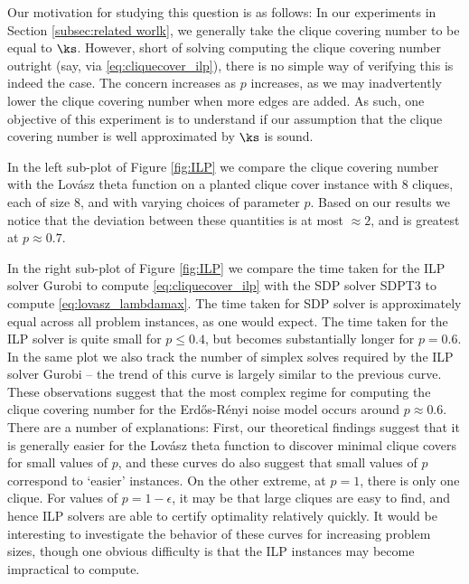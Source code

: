 Our motivation for studying this question is as follows:  In our experiments in Section \ref{subsec:related worlk}, we generally take the clique covering number to be equal to $\ks$.  However, short of solving computing the clique covering number outright (say, via \eqref{eq:cliquecover_ilp}), there is no simple way of verifying this is indeed the case.  The concern increases as $p$ increases, as we may inadvertently lower the clique covering number when more edges are added.  As such, one objective of this experiment is to understand if our assumption that the clique covering number is well approximated by $\ks$ is sound.  


In the left sub-plot of Figure \ref{fig:ILP} we compare the clique covering number with the Lov\'asz theta function on a planted clique cover instance with $8$ cliques, each of size $8$, and with varying choices of parameter $p$.  Based on our results we notice that the deviation between these quantities is at most $\approx 2$, and is greatest at $p \approx 0.7$.  

In the right sub-plot of Figure \ref{fig:ILP} we compare the time taken for the ILP solver Gurobi \cite{gurobi} to compute \eqref{eq:cliquecover_ilp} with the SDP solver SDPT3 \cite{sdpt3:1,sdpt3:2} to compute \eqref{eq:lovasz_lambdamax}.  The time taken for SDP solver is approximately equal across all problem instances, as one would expect.  The time taken for the ILP solver is quite small for $p \leq 0.4$, but becomes substantially longer for $p=0.6$.  In the same plot we also track the number of simplex solves required by the ILP solver Gurobi -- the trend of this curve is largely similar to the previous curve.  These observations suggest that the most complex regime for computing the clique covering number for the Erd\H{o}s-R\'enyi noise model occurs around $p \approx 0.6$.  There are a number of explanations: First, our theoretical findings suggest that it is generally easier for the Lov\'asz theta function to discover minimal clique covers for small values of $p$, and these curves do also suggest that small values of $p$ correspond to `easier' instances.  On the other extreme, at $p = 1$, there is only one clique.  For values of $p = 1-\epsilon$, it may be that large cliques are easy to find, and hence ILP solvers are able to certify optimality relatively quickly.  It would be interesting to investigate the behavior of these curves for increasing problem sizes, though one obvious difficulty is that the ILP instances may become impractical to compute. 



